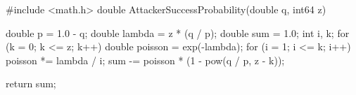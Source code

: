 #include <math.h>
double AttackerSuccessProbability(double q, int64 z)
{
    double p = 1.0 - q;
    double lambda = z * (q / p);
    double sum = 1.0;
    int i, k;
    for (k = 0; k <= z; k++)
    {
        double poisson = exp(-lambda);
        for (i = 1; i <= k; i++)
            poisson *= lambda / i;
        sum -= poisson * (1 - pow(q / p, z - k));
    }

    return sum;
}